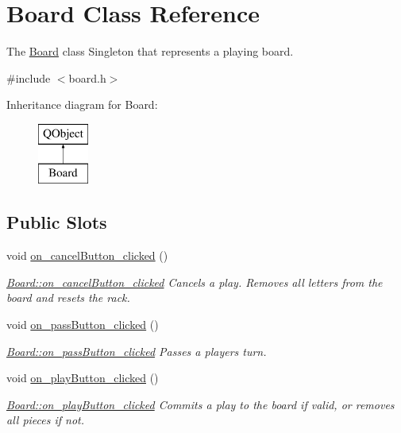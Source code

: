 \hypertarget{class_board}{\section{Board Class Reference}
\label{class_board}
}


The \hyperlink{class_board}{Board} class Singleton that represents a playing board.  




{\ttfamily \#include $<$board.\-h$>$}

Inheritance diagram for Board\-:\begin{figure}[H]
\begin{center}
\leavevmode
\includegraphics[height=2.000000cm]{class_board}
\end{center}
\end{figure}
\subsection*{Public Slots}
\begin{DoxyCompactItemize}
\item 
void \hyperlink{class_board_a9811fc5a0ae0953a45ff7e576af9411d}{on\-\_\-cancel\-Button\-\_\-clicked} ()
\begin{DoxyCompactList}\small\item\em \hyperlink{class_board_a9811fc5a0ae0953a45ff7e576af9411d}{Board\-::on\-\_\-cancel\-Button\-\_\-clicked} Cancels a play. Removes all letters from the board and resets the rack. \end{DoxyCompactList}\item 
void \hyperlink{class_board_a6aed1991c2174d60b320545db8ea015d}{on\-\_\-pass\-Button\-\_\-clicked} ()
\begin{DoxyCompactList}\small\item\em \hyperlink{class_board_a6aed1991c2174d60b320545db8ea015d}{Board\-::on\-\_\-pass\-Button\-\_\-clicked} Passes a players turn. \end{DoxyCompactList}\item 
void \hyperlink{class_board_afacf11c194d187ece00a84aa2504ca31}{on\-\_\-play\-Button\-\_\-clicked} ()
\begin{DoxyCompactList}\small\item\em \hyperlink{class_board_afacf11c194d187ece00a84aa2504ca31}{Board\-::on\-\_\-play\-Button\-\_\-clicked} Commits a play to the board if valid, or removes all pieces if not. \end{DoxyCompactList}\end{DoxyCompactItemize}
